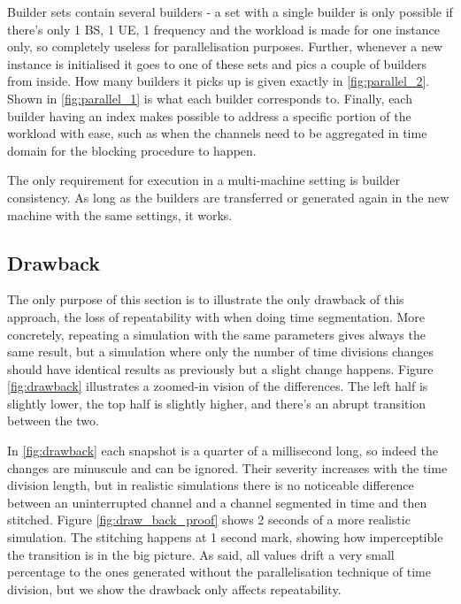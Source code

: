Builder sets contain several builders - a set with a single builder is only possible if there's only 1 \acs{BS}, 1 \acs{UE}, 1 frequency and the workload is made for one instance only, so completely useless for parallelisation purposes. Further, whenever a new instance is initialised it goes to one of these sets and pics a couple of builders from inside. How many builders it picks up is given exactly in \ref{fig:parallel_2}. Shown in \ref{fig:parallel_1} is what each builder corresponds to. Finally, each builder having an index makes possible to address a specific portion of the workload with ease, such as  when the channels need to be aggregated in time domain for the blocking procedure to happen.







The only requirement for execution in a multi-machine setting is builder consistency. As long as the builders are transferred or generated again in the new machine with the same settings, it works.

\subsection*{Drawback}
The only purpose of this section is to illustrate the only drawback of this approach, the loss of repeatability with when doing time segmentation. More concretely, repeating a simulation with the same parameters gives always the same result, but a simulation where only the number of time divisions changes should have identical results as previously but a slight change happens.
Figure \ref{fig:drawback} illustrates a zoomed-in vision of the differences. The left half is slightly lower, the top half is slightly higher, and there's an abrupt transition between the two.




In \ref{fig:drawback} each snapshot is a quarter of a millisecond long, so indeed the changes are minuscule and can be ignored. Their severity increases with the time division length, but in realistic simulations there is no noticeable difference between an uninterrupted channel and a channel segmented in time and then stitched. Figure \ref{fig:draw_back_proof} shows 2 seconds of a more realistic simulation. The stitching happens at 1 second mark, showing how imperceptible the transition is in the big picture. As said, all values drift a very small percentage to the ones generated without the parallelisation technique of time division, but we show the drawback only affects repeatability. 

